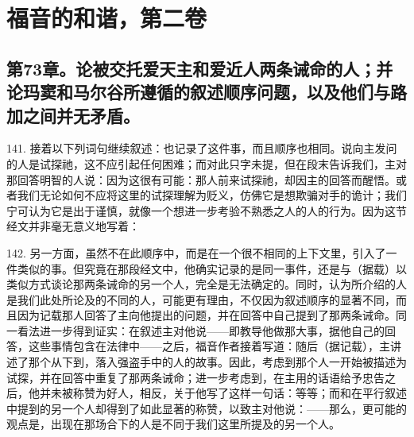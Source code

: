 

\section{福音的和谐，第二卷}


\subsection{第73章。论被交托爱天主和爱近人两条诫命的人；并论玛窦和马尔谷所遵循的叙述顺序问题，以及他们与路加之间并无矛盾。}

141. 接着以下列词句继续叙述：也记录了这件事，而且顺序也相同。说向主发问的人是试探祂，这不应引起任何困难；而对此只字未提，但在段末告诉我们，主对那回答明智的人说：因为这很有可能：那人前来试探祂，却因主的回答而醒悟。或者我们无论如何不应将这里的试探理解为贬义，仿佛它是想欺骗对手的诡计；我们宁可认为它是出于谨慎，就像一个想进一步考验不熟悉之人的人的行为。因为这节经文并非毫无意义地写着：\par

142. 另一方面，虽然不在此顺序中，而是在一个很不相同的上下文里，引入了一件类似的事。但究竟在那段经文中，他确实记录的是同一事件，还是与（据载）以类似方式谈论那两条诫命的另一个人，完全是无法确定的。同时，认为所介绍的人是我们此处所论及的不同的人，可能更有理由，不仅因为叙述顺序的显著不同，而且因为记载那人回答了主向他提出的问题，并在回答中自己提到了那两条诫命。同一看法进一步得到证实：在叙述主对他说——即教导他做那大事，据他自己的回答，这些事情包含在法律中——之后，福音作者接着写道：随后（据记载），主讲述了那个从下到，落入强盗手中的人的故事。因此，考虑到那个人一开始被描述为试探，并在回答中重复了那两条诫命；进一步考虑到，在主用的话语给予忠告之后，他并未被称赞为好人，相反，关于他写了这样一句话：等等；而和在平行叙述中提到的另一个人却得到了如此显著的称赞，以致主对他说：——那么，更可能的观点是，出现在那场合下的人是不同于我们这里所提及的另一个人。\par

